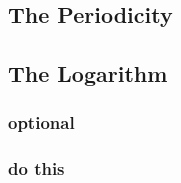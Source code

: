 \subsection{The Periodicity}

\subsection{The Logarithm}
\subsubsection{}
\subsubsection{optional}
\subsubsection{}
\subsubsection{}
\subsubsection{}
\subsubsection{}
\subsubsection{}
\subsubsection{do this}
\subsubsection{}
\subsubsection{}
